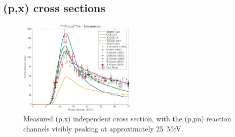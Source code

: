 









\subsection{(p,x) cross sections} 

\begin{figure}[h]
 \centering
 \includegraphics[width=0.5\textwidth]{./figures/64Cu.pdf}
 \caption{Measured (p,x) independent cross section, with the (p,pn) reaction channels visibly peaking at approximately \mbox{25 MeV}.}
 \label{fig:64Cu}
\end{figure}

